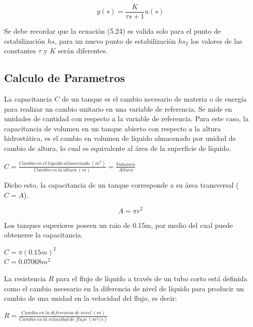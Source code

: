 \documentclass[a4paper,12pt,twoside]{proyectotanquesecci}
\begin{document}
\begin{equation}
y(s)=\frac{K}{\tau s+1}u(s)
\end{equation}

Se debe recordar que la ecuación (5.24) es valida solo para el punto de estabilización $hs$, para un nuevo punto de estabilización $hs_{2}$ los valores de las constantes $\tau$ y $K$ serán diferentes.




\subsection{Calculo de Parametros}

La capacitancia $C$ de un tanque es el cambio necesario de materia o de energía para realizar un cambio unitario en una variable de referencia. Se mide en unidades de cantidad con respecto a la variable de referencia. Para este caso, la capacitancia de volumen en un tanque abierto con respecto a la altura hidrostática, es el cambio en volumen de líquido almacenado por unidad de cambio de altura, lo cual es equivalente al área de la superficie de líquido.

\begin{center}
$C=\frac{Cambio\ en\ el\ liquido\ almacenado\ (m^{3})}{Cambio\ en\ la\ altura\ (m)}=\frac{Volumen}{Altura}$
\end{center}

Dicho esto, la capacitancia de un tanque corresponde a su área transversal ($C=A$).

\begin{equation}
A=\pi r^{2}
\end{equation}

Los tanques superiores poseen un raio de 0.15m, por medio del cual puede obtenerse la capacitancia.

\begin{center}
$C=\pi (0.15m)^{2}$ \\
$C=0.07068 m^{2}$
\end{center}

La resistencia $R$ para el flujo de líquido a través de un tubo corto está definida como el cambio necesario en la diferencia de nivel de líquido para producir un cambio de una unidad en la velocidad del flujo, es decir:

\begin{center}
$R=\frac{Cambio\ en\ la\ diferencia\ de\ nivel\ (m)}{Cambio\ en\ la\ velocidad\ de\ flujo\ (m^{3}/s)}$
\end{center}
\end{document}

